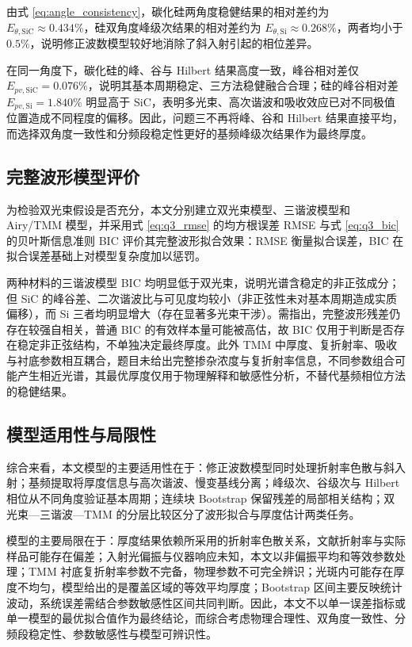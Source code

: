 \documentclass[withoutpreface,bwprint]{cumcmthesis}
\begin{document}
由式 \eqref{eq:angle_consistency}，碳化硅两角度稳健结果的相对差约为 $E_{\theta,\mathrm{SiC}}\approx0.434\%$，硅双角度峰级次结果的相对差约为 $E_{\theta,\mathrm{Si}}\approx0.268\%$，两者均小于 $0.5\%$，说明修正波数模型较好地消除了斜入射引起的相位差异。

在同一角度下，碳化硅的峰、谷与 Hilbert 结果高度一致，峰谷相对差仅 $E_{pv,\mathrm{SiC}}=0.076\%$，说明其基本周期稳定、三方法稳健融合合理；硅的峰谷相对差 $E_{pv,\mathrm{Si}}=1.840\%$ 明显高于 SiC，表明多光束、高次谐波和吸收效应已对不同极值位置造成不同程度的偏移。因此，问题三不再将峰、谷和 Hilbert 结果直接平均，而选择双角度一致性和分频段稳定性更好的基频峰级次结果作为最终厚度。

\subsection{完整波形模型评价}
\label{subsec:full_waveform_evaluation}

为检验双光束假设是否充分，本文分别建立双光束模型、三谐波模型和 Airy/TMM 模型，并采用式 \eqref{eq:q3_rmse} 的均方根误差 RMSE 与式 \eqref{eq:q3_bic} 的贝叶斯信息准则 BIC 评价其完整波形拟合效果：RMSE 衡量拟合误差，BIC 在拟合误差基础上对模型复杂度加以惩罚。

两种材料的三谐波模型 BIC 均明显低于双光束，说明光谱含稳定的非正弦成分；但 SiC 的峰谷差、二次谐波比与可见度均较小（非正弦性未对基本周期造成实质偏移），而 Si 三者均明显增大（存在显著多光束干涉）。需指出，完整波形残差仍存在较强自相关，普通 BIC 的有效样本量可能被高估，故 BIC 仅用于判断是否存在稳定非正弦结构，不单独决定最终厚度。此外 TMM 中厚度、复折射率、吸收与衬底参数相互耦合，题目未给出完整掺杂浓度与复折射率信息，不同参数组合可能产生相近光谱，其最优厚度仅用于物理解释和敏感性分析，不替代基频相位方法的稳健结果。

\subsection{模型适用性与局限性}
\label{subsec:model_limitations}

综合来看，本文模型的主要适用性在于：修正波数模型同时处理折射率色散与斜入射；基频提取将厚度信息与高次谐波、慢变基线分离；峰级次、谷级次与 Hilbert 相位从不同角度验证基本周期；连续块 Bootstrap 保留残差的局部相关结构；双光束—三谐波—TMM 的分层比较区分了波形拟合与厚度估计两类任务。

模型的主要局限在于：厚度结果依赖所采用的折射率色散关系，文献折射率与实际样品可能存在偏差；入射光偏振与仪器响应未知，本文以非偏振平均和等效参数处理；TMM 衬底复折射率参数不完备，物理参数不可完全辨识；光斑内可能存在厚度不均匀，模型给出的是覆盖区域的等效平均厚度；Bootstrap 区间主要反映统计波动，系统误差需结合参数敏感性区间共同判断。因此，本文不以单一误差指标或单一模型的最优拟合值作为最终结论，而综合考虑物理合理性、双角度一致性、分频段稳定性、参数敏感性与模型可辨识性。
\end{document}
